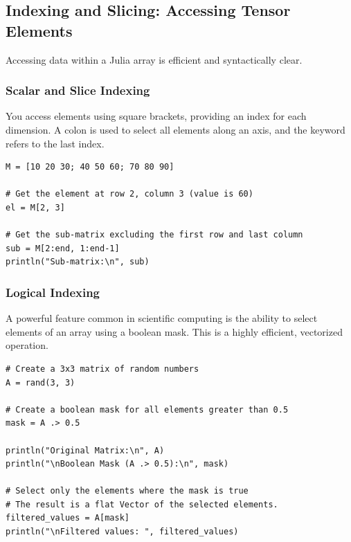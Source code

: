 \subsection*{Indexing and Slicing: Accessing Tensor Elements}
Accessing data within a Julia array is efficient and syntactically clear.

\subsubsection*{Scalar and Slice Indexing}
You access elements using square brackets, providing an index for each dimension. A colon \jcode{:} is used to select all elements along an axis, and the keyword  refers to the last index.

\begin{example}
\text{ }\begin{verbatim}
M = [10 20 30; 40 50 60; 70 80 90]

# Get the element at row 2, column 3 (value is 60)
el = M[2, 3]

# Get the sub-matrix excluding the first row and last column
sub = M[2:end, 1:end-1]
println("Sub-matrix:\n", sub)
\end{verbatim}
\end{example}

\subsubsection*{Logical Indexing}
A powerful feature common in scientific computing is the ability to select elements of an array using a boolean mask. This is a highly efficient, vectorized operation.

\begin{example}
\text{ }\begin{verbatim}
# Create a 3x3 matrix of random numbers
A = rand(3, 3)

# Create a boolean mask for all elements greater than 0.5
mask = A .> 0.5

println("Original Matrix:\n", A)
println("\nBoolean Mask (A .> 0.5):\n", mask)

# Select only the elements where the mask is true
# The result is a flat Vector of the selected elements.
filtered_values = A[mask]
println("\nFiltered values: ", filtered_values)
\end{verbatim}
\end{example}

